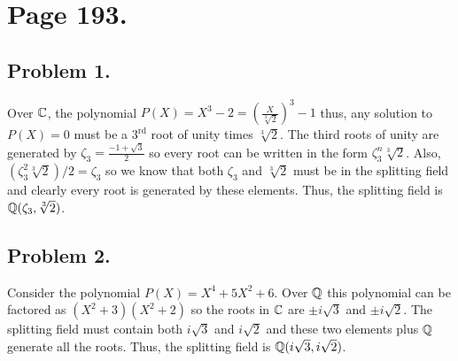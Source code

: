 \documentclass[12pt]{extarticle}
\begin{document}

\section*{Page 193.} 
\subsection*{Problem 1.}
Over $\mathbb{C}$, the polynomial $P(X) = X^3 - 2 = \left(\frac{X}{\sqrt[3]{2}}\right)^3 - 1$ thus, any solution to $P(X) = 0$ must be a $3^{\mathrm{rd}}$ root of unity times $\sqrt[3]{2}$. The third roots of unity are generated by $\zeta_3 = \frac{-1 + \sqrt{3}}{2}$ so every root can be written in the form $\zeta_3^{n} \sqrt[3]{2}$. Also, $(\zeta_3^2 \sqrt[3]{2})/2 = \zeta_3$ so we know that both $\zeta_3$ and $\sqrt[3]{2}$ must be in the splitting field and clearly every root is generated by these elements. Thus, the splitting field is $\mathbb{Q}(\zeta_3, \sqrt[3]{2})$.   

\subsection*{Problem 2.}
Consider the polynomial $P(X) = X^4 + 5X^2 + 6$. Over $\mathbb{Q}$ this polynomial can be factored as $(X^2 + 3)(X^2 + 2)$ so the roots in $\mathbb{C}$ are $\pm i \sqrt{3}$ and $\pm i \sqrt{2}$. The splitting field must contain both $i \sqrt{3}$ and $i \sqrt{2}$ and these two elements plus $\mathbb{Q}$ generate all the roots. Thus, the splitting field is $\mathbb{Q}(i\sqrt{3}, i\sqrt{2})$.  
\end{document}
